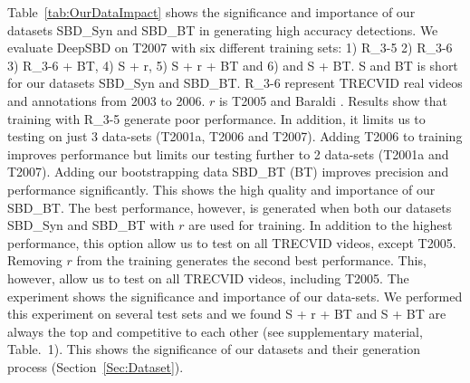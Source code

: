 \documentclass[journal]{IEEEtran}
\begin{document}
Table~\ref{tab:OurDataImpact} shows the significance and importance of our datasets SBD\_Syn and SBD\_BT in generating high accuracy detections. We evaluate DeepSBD on T2007 with six different training sets: 1) R\_3-5 2) R\_3-6 3) R\_3-6 + BT, 4) S + r, 5) S + r + BT and 6) and S + BT. S and BT is short for our datasets SBD\_Syn and SBD\_BT. R\_3-6 represent TRECVID real videos and annotations from 2003 to 2006. $r$ is T2005 and Baraldi \cite{Baraldi15}. Results show that training with R\_3-5  generate poor performance. In addition, it limits us to testing on just 3 data-sets (T2001a, T2006 and T2007). Adding T2006 to training improves performance but limits our testing further to 2 data-sets (T2001a and T2007). Adding our bootstrapping data SBD\_BT (BT) improves precision and performance significantly. This shows the high quality and importance of our SBD\_BT. The best performance, however, is generated when both our datasets SBD\_Syn and SBD\_BT with $r$ are used for training. In addition to the highest performance, this option allow us to test on all TRECVID videos, except T2005. Removing $r$ from the training generates the second best performance. This, however, allow us to test on all TRECVID videos, including T2005. The experiment shows the significance and importance of our data-sets. We performed this experiment on several test sets and we found S + r + BT and S + BT are always the top and competitive to each other (see supplementary material, Table.~1). This shows the significance of our datasets and their generation process (Section~\ref{Sec:Dataset}).  
\end{document}
